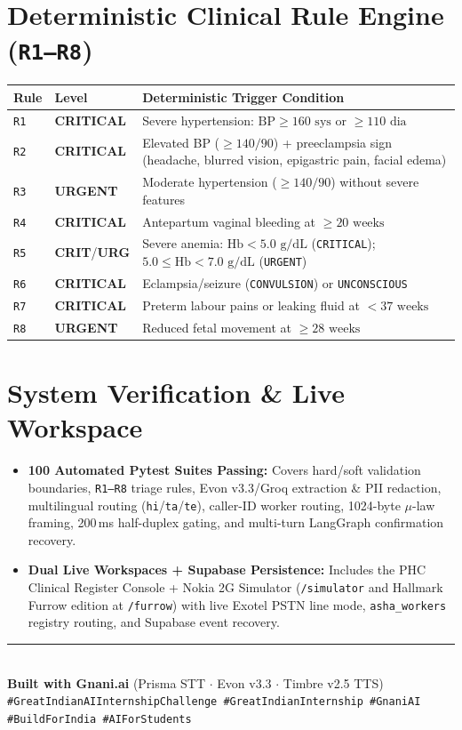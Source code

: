 \documentclass[9pt,a4paper,twocolumn]{article}
\begin{document}
\section{Deterministic Clinical Rule Engine (\texttt{R1--R8})}
\vspace{1pt}
\renewcommand{\arraystretch}{1.12}
\begin{tabularx}{\columnwidth}{@{}l l X@{}}
\toprule
\textbf{Rule} & \textbf{Level} & \textbf{Deterministic Trigger Condition} \\
\midrule
\texttt{R1} & \textcolor{accent}{\textbf{CRITICAL}} & Severe hypertension: $\text{BP} \ge 160\text{ sys}$ or $\ge 110\text{ dia}$ \\
\texttt{R2} & \textcolor{accent}{\textbf{CRITICAL}} & Elevated BP ($\ge 140/90$) + preeclampsia sign (headache, blurred vision, epigastric pain, facial edema) \\
\texttt{R3} & \textbf{URGENT} & Moderate hypertension ($\ge 140/90$) without severe features \\
\texttt{R4} & \textcolor{accent}{\textbf{CRITICAL}} & Antepartum vaginal bleeding at $\ge 20\text{ weeks}$ \\
\texttt{R5} & \textcolor{accent}{\textbf{CRIT}}/\textbf{URG} & Severe anemia: $\text{Hb} < 5.0\text{ g/dL}$ (\texttt{CRITICAL}); $5.0 \le \text{Hb} < 7.0\text{ g/dL}$ (\texttt{URGENT}) \\
\texttt{R6} & \textcolor{accent}{\textbf{CRITICAL}} & Eclampsia/seizure (\texttt{CONVULSION}) or \texttt{UNCONSCIOUS} \\
\texttt{R7} & \textcolor{accent}{\textbf{CRITICAL}} & Preterm labour pains or leaking fluid at $< 37\text{ weeks}$ \\
\texttt{R8} & \textbf{URGENT} & Reduced fetal movement at $\ge 28\text{ weeks}$ \\
\bottomrule
\end{tabularx}

\section{System Verification \& Live Workspace}
\begin{itemize}
  \item \textbf{100 Automated Pytest Suites Passing:} Covers hard/soft validation boundaries, \texttt{R1--R8} triage rules, Evon v3.3/Groq extraction \& PII redaction, multilingual routing (\texttt{hi}/\texttt{ta}/\texttt{te}), caller-ID worker routing, 1024-byte $\mu$-law framing, 200\,ms half-duplex gating, and multi-turn LangGraph confirmation recovery.
  \item \textbf{Dual Live Workspaces + Supabase Persistence:} Includes the PHC Clinical Register Console + Nokia 2G Simulator (\texttt{/simulator} and Hallmark Furrow edition at \texttt{/furrow}) with live Exotel PSTN line mode, \texttt{asha\_workers} registry routing, and Supabase event recovery.
\end{itemize}

\vfill
\rule{\columnwidth}{0.5pt}\\
{\scriptsize\color{muted}\textbf{Built with Gnani.ai} (Prisma STT $\cdot$ Evon v3.3 $\cdot$ Timbre v2.5 TTS)\\
\texttt{\#GreatIndianAIInternshipChallenge \#GreatIndianInternship \#GnaniAI \#BuildForIndia \#AIForStudents}}
\end{document}

